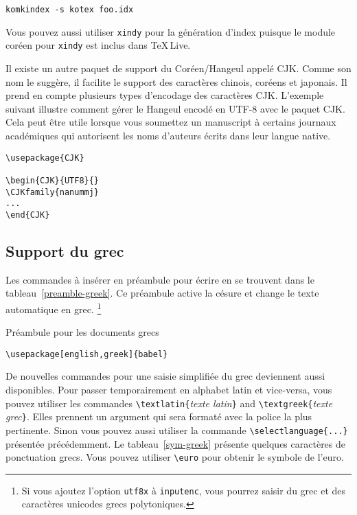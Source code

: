 \begin{lscommand}
\verb|komkindex -s kotex foo.idx|
\end{lscommand}

Vous pouvez aussi utiliser \texttt{xindy} pour la génération d'index
puisque le module coréen pour \texttt{xindy} est inclus dans
\TeX\,Live.

Il existe un autre paquet de support du Coréen/Hangeul appelé
CJK. Comme son nom le suggère, il facilite le support des caractères
chinois, coréens et japonais. Il prend en compte plusieurs types
d'encodage des caractères CJK. L'exemple suivant illustre comment
gérer le Hangeul encodé en UTF-8 avec le paquet CJK. Cela peut être
utile lorsque vous soumettez un manuscript à certains journaux
académiques qui autorisent les noms d'auteurs écrits dans leur langue
native.

\begin{verbatim}
\usepackage{CJK}

\begin{CJK}{UTF8}{}
\CJKfamily{nanummj}
...
\end{CJK}
\end{verbatim}


\subsection{Support du grec}
Les commandes à insérer en préambule pour écrire en 
 se trouvent dans le tableau~\ref{preamble-greek}. Ce
préambule active la césure et change le texte automatique en grec.%
\footnote{Si vous ajoutez l'option \texttt{utf8x} à
  \texttt{inputenc}, vous pourrez saisir du grec et des caractères
  unicodes grecs polytoniques.}

\begin{table}[btp]
\caption{Préambule pour les documents grecs} \label{preamble-greek}
\begin{lined}{7cm}
\begin{verbatim}
\usepackage[english,greek]{babel}
\end{verbatim}
\end{lined}
\end{table}

De nouvelles commandes pour une saisie simplifiée du grec deviennent
aussi disponibles. Pour passer temporairement en alphabet latin et
vice-versa, vous pouvez utiliser les commandes
\verb|\textlatin{|\emph{texte latin}\verb|}| and
\verb|\textgreek{|\emph{texte grec}\verb|}|. Elles prennent un
argument qui sera formaté avec la police la plus pertinente.
Sinon vous pouvez aussi utiliser la commande
\verb|\selectlanguage{...}| présentée précédemment. Le
tableau~\ref{sym-greek} présente quelques caractères de ponctuation
grecs. Vous pouvez utiliser \verb|\euro| pour obtenir le symbole de
l'euro.


